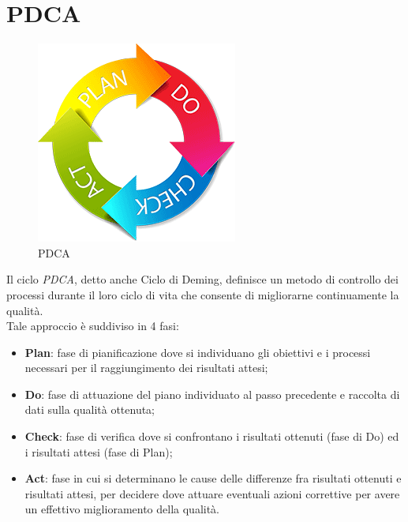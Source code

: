 \newpage
\section{PDCA}

\label{PDCA}
\begin{figure}[h]
\centering
\includegraphics[scale=0.5,keepaspectratio]{PDCA.png}
\caption{PDCA}
\end{figure}
\FloatBarrier

Il ciclo \textit{PDCA}, detto anche Ciclo di Deming, definisce un metodo di controllo dei processi durante il loro ciclo di vita che consente di migliorarne continuamente la qualità. \\ Tale approccio è suddiviso in 4 fasi:
\begin{itemize}
\item \textbf{Plan}: fase di pianificazione dove si individuano gli obiettivi e i processi necessari per il raggiungimento dei risultati attesi;
\item \textbf{Do}: fase di attuazione del piano individuato al passo precedente e raccolta di dati sulla qualità ottenuta;
\item \textbf{Check}: fase di verifica dove si confrontano i risultati ottenuti (fase di Do) ed i risultati attesi (fase di Plan);
\item \textbf{Act}: fase in cui si determinano le cause delle differenze fra risultati ottenuti e risultati attesi, per decidere dove attuare eventuali azioni correttive per avere un effettivo miglioramento della qualità.
\end{itemize}